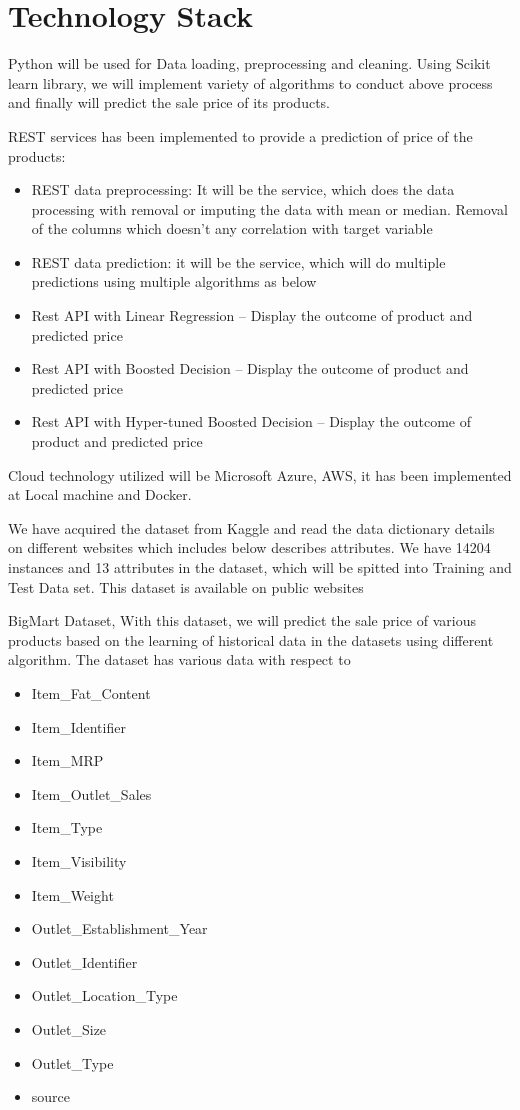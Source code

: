 \section{Technology Stack}

Python will be used for Data loading, preprocessing and cleaning. Using 
Scikit learn library, we will implement variety of algorithms to conduct 
above process and finally will predict the sale price of its products.

REST services has been implemented to provide a prediction of price of the 
products:

\begin{itemize}
	\item REST data preprocessing: It will be the service, which does 
the data processing 
	with removal or imputing the data with mean or median. Removal of 
the columns which doesn’t any correlation with target variable
	\item REST data prediction: it will be the service, which will 
do multiple predictions using multiple algorithms as below
	
	\item Rest API with Linear Regression – Display the outcome 
of product and predicted price
	\item Rest API with Boosted Decision – Display the outcome of 
product and predicted price
	\item Rest API with Hyper-tuned Boosted Decision – Display the 
outcome of product and predicted price
\end{itemize}

Cloud technology utilized will be Microsoft Azure, AWS, it has been 
implemented at Local machine and Docker.

We have acquired the dataset from Kaggle and read the data dictionary details 
on different websites which includes below describes attributes. We have 14204 
instances and 13 attributes in the dataset, which will be spitted into 
Training and Test Data set. This dataset is available on public websites

BigMart Dataset, With this dataset, we will predict the sale price of 
various products based on the learning of historical data in the datasets 
using different algorithm. The dataset has various data with respect to
\begin{itemize}
\item Item_Fat_Content
\item Item_Identifier
\item Item_MRP
\item Item_Outlet_Sales
\item Item_Type
\item Item_Visibility
\item Item_Weight
\item Outlet_Establishment_Year
\item Outlet_Identifier
\item Outlet_Location_Type
\item Outlet_Size
\item Outlet_Type
\item source
\end{itemize}
~\cite{kaggleds}

